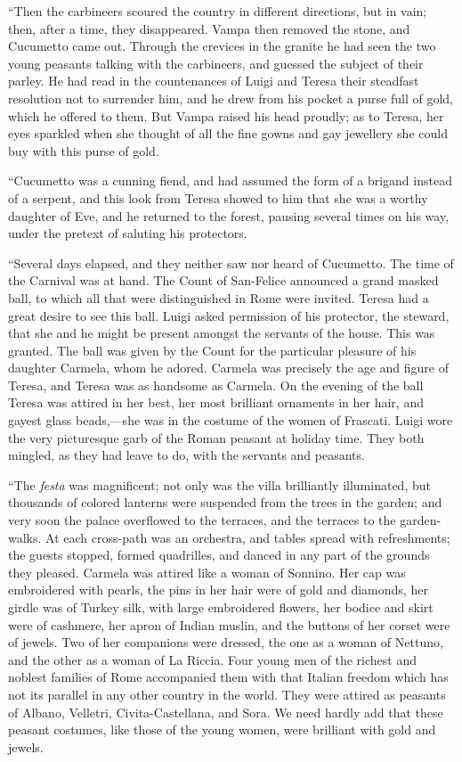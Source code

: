 “Then the carbineers scoured the country in different directions, but
in vain; then, after a time, they disappeared. Vampa then removed the
stone, and Cucumetto came out. Through the crevices in the granite he
had seen the two young peasants talking with the carbineers, and
guessed the subject of their parley. He had read in the countenances of
Luigi and Teresa their steadfast resolution not to surrender him, and
he drew from his pocket a purse full of gold, which he offered to them.
But Vampa raised his head proudly; as to Teresa, her eyes sparkled when
she thought of all the fine gowns and gay jewellery she could buy with
this purse of gold.

“Cucumetto was a cunning fiend, and had assumed the form of a brigand
instead of a serpent, and this look from Teresa showed to him that she
was a worthy daughter of Eve, and he returned to the forest, pausing
several times on his way, under the pretext of saluting his protectors.

“Several days elapsed, and they neither saw nor heard of Cucumetto. The
time of the Carnival was at hand. The Count of San-Felice announced a
grand masked ball, to which all that were distinguished in Rome were
invited. Teresa had a great desire to see this ball. Luigi asked
permission of his protector, the steward, that she and he might be
present amongst the servants of the house. This was granted. The ball
was given by the Count for the particular pleasure of his daughter
Carmela, whom he adored. Carmela was precisely the age and figure of
Teresa, and Teresa was as handsome as Carmela. On the evening of the
ball Teresa was attired in her best, her most brilliant ornaments in
her hair, and gayest glass beads,—she was in the costume of the women
of Frascati. Luigi wore the very picturesque garb of the Roman peasant
at holiday time. They both mingled, as they had leave to do, with the
servants and peasants.

“The \textit{festa} was magnificent; not only was the villa brilliantly
illuminated, but thousands of colored lanterns were suspended from the
trees in the garden; and very soon the palace overflowed to the
terraces, and the terraces to the garden-walks. At each cross-path was
an orchestra, and tables spread with refreshments; the guests stopped,
formed quadrilles, and danced in any part of the grounds they pleased.
Carmela was attired like a woman of Sonnino. Her cap was embroidered
with pearls, the pins in her hair were of gold and diamonds, her girdle
was of Turkey silk, with large embroidered flowers, her bodice and
skirt were of cashmere, her apron of Indian muslin, and the buttons of
her corset were of jewels. Two of her companions were dressed, the one
as a woman of Nettuno, and the other as a woman of La Riccia. Four
young men of the richest and noblest families of Rome accompanied them
with that Italian freedom which has not its parallel in any other
country in the world. They were attired as peasants of Albano,
Velletri, Civita-Castellana, and Sora. We need hardly add that these
peasant costumes, like those of the young women, were brilliant with
gold and jewels.

